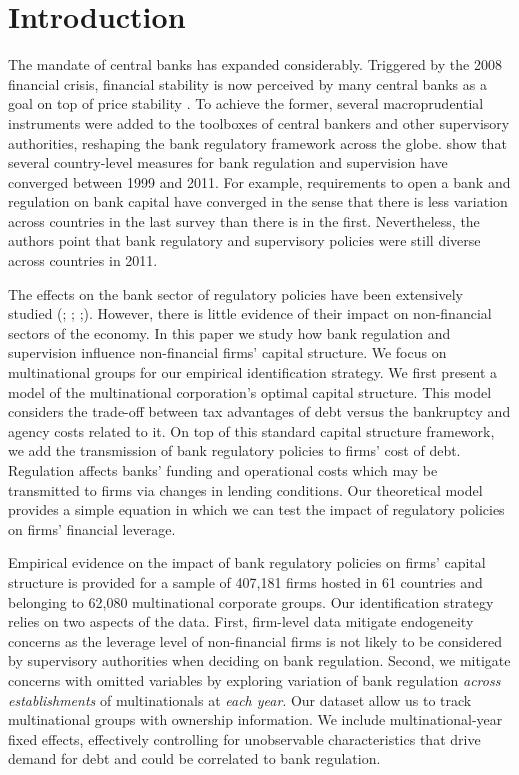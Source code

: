 \documentclass[12pt]{article}
\begin{document}
	\doublespacing
	
	
	\section{Introduction} \label{sec:introduction}
	The mandate of central banks has expanded considerably. Triggered by the 2008 financial crisis, financial stability is now perceived by many central banks as a goal on top of price stability \citep*{blinder2017necessity}. To achieve the former, several macroprudential instruments were added to the toolboxes of central bankers and other supervisory authorities, reshaping the bank regulatory framework across the globe. \cite*{barth2013bank} show that several country-level measures for bank regulation and supervision have converged between 1999 and 2011. For example, requirements to open a bank and regulation on bank capital have converged in the sense that there is less variation across countries in the last survey than there is in the first. Nevertheless, the authors point that bank regulatory and supervisory policies were still diverse across countries in 2011.
	
	The effects on the bank sector of regulatory policies have been extensively studied (\cite*{barth2013}; \cite*{anginer2014does};  \cite*{caprio2014macro};\cite*{demirguc2013bank}). However, there is little evidence of their impact on non-financial sectors of the economy. In this paper we study how bank regulation and supervision influence non-financial firms' capital structure. We focus on multinational groups for our empirical identification strategy. We first present a model of the multinational corporation's optimal capital structure. This model considers the trade-off between tax advantages of debt versus the bankruptcy and agency costs related to it. On top of this standard capital structure framework, we add the transmission of bank regulatory policies to firms' cost of debt. Regulation affects banks' funding and operational costs which may be transmitted to firms via changes in lending conditions. Our theoretical model provides a simple equation in which we can test the impact of regulatory policies on firms' financial leverage.
	
	Empirical evidence on the impact of bank regulatory policies on firms' capital structure is provided for a sample of 407,181 firms hosted in 61 countries and belonging to 62,080 multinational corporate groups. Our identification strategy relies on two aspects of the data. First, firm-level data mitigate endogeneity concerns as the leverage level of non-financial firms is not likely to be considered by supervisory authorities when deciding on bank regulation. Second, we mitigate concerns with omitted variables by exploring variation of bank regulation \textit{across establishments} of multinationals at \textit{each year}. Our dataset allow us to track multinational groups with ownership information. We include multinational-year fixed effects, effectively controlling for unobservable characteristics that drive demand for debt and could be correlated to bank regulation.
	
\end{document}
